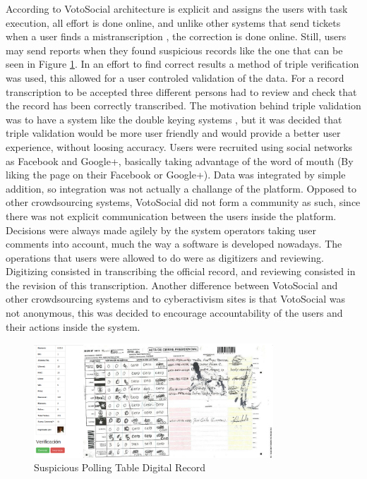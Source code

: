 \documentclass[a4paper,10pt]{article}
\begin{document}
According to \cite{doan2011} VotoSocial architecture is explicit and assigns the users with task execution, all effort is done online, and unlike other systems that send tickets when a user finds a mistranscription \citep{haaf2013}, the correction is done online. Still, users may send reports when they found suspicious records like the one that can be seen in Figure \ref{fig:strange}. In an effort to find correct results a method of triple verification was used, this allowed for a user controled validation of the data. For a record transcription to be accepted three different persons had to review and check that the record has been correctly transcribed. The motivation behind triple validation was to have a system like the double keying systems \citep{haaf2013}, but it was decided that triple validation would be more user friendly and would provide a better user experience, without loosing accuracy. Users were recruited using social networks as Facebook and Google+, basically taking advantage of the word of mouth (By liking the page on their Facebook or Google+). Data was integrated by simple addition, so integration was not actually a challange of the platform. Opposed to other crowdsourcing systems, VotoSocial did not form a community as such, since there was not explicit communication between the users inside the platform. Decisions were always made agilely by the system operators taking user comments into account, much the way a software is developed nowadays. The operations that users were allowed to do were as digitizers and reviewing. Digitizing consisted in transcribing the official record, and reviewing consisted in the revision of this transcription. Another difference between VotoSocial and other crowdsourcing systems and to cyberactivism sites is that VotoSocial was not anonymous, this was decided to encourage accountability of the users and their actions inside the system.

\begin{figure}[h!]
    \centering
    \includegraphics[width=0.8\textwidth]{images/vs-valid-strange}
    \caption{Suspicious Polling Table Digital Record}
    \label{fig:strange}
\end{figure}
\end{document}
